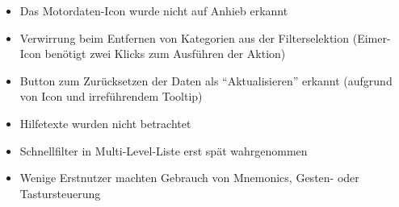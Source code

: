 \begin{itemize}
 \item Das Motordaten-Icon wurde nicht auf Anhieb erkannt
 \item Verwirrung beim Entfernen von Kategorien aus der Filterselektion (Eimer-Icon benötigt zwei Klicks zum Ausführen der Aktion)
\end{itemize}
\begin{itemize}
 \item Button zum Zurücksetzen der Daten als \enquote{Aktualisieren} erkannt (aufgrund von Icon und irreführendem Tooltip)
\end{itemize}
\begin{itemize}
 \item Hilfetexte wurden nicht betrachtet
 \item Schnellfilter in Multi-Level-Liste erst spät wahrgenommen
 \item Wenige Erstnutzer machten Gebrauch von Mnemonics, Gesten- oder Tastursteuerung
\end{itemize}